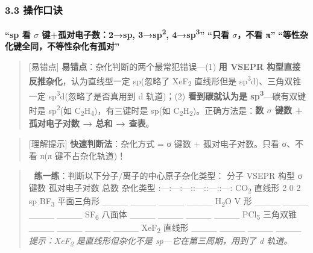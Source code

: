 \subsubsection{3.3 操作口诀}\label{ux64cdux4f5cux53e3ux8bc0}

\textbf{``sp 看 \(\sigma\) 键+孤对电子数：2→sp, 3→sp\textsuperscript{2}, 4→sp\textsuperscript{3}''}
\textbf{``只看 \(\sigma\)，不看 π''}
\textbf{``等性杂化键全同，不等性杂化有孤对''}

\begin{quote}
{[}易错点{]} \textbf{易错点}：杂化判断的两个最常犯错误---(1) \textbf{用 VSEPR 构型直接反推杂化}，认为直线型一定 sp(忽略了 XeF\textsubscript{2} 直线形但是 sp\textsuperscript{3}d)、三角双锥一定 sp\textsuperscript{3}d(忽略了是否真用到 d 轨道)；(2) \textbf{看到碳就认为是 sp\textsuperscript{3}}---碳有双键时是 sp\textsuperscript{2}(如 C\textsubscript{2}H\textsubscript{4})，有三键时是 sp(如 C\textsubscript{2}H\textsubscript{2})。正确方法是：\textbf{数 \(\sigma\) 键数 + 孤对电子对数 → 总和 → 查表}。
\end{quote}

\begin{quote}
{[}理解提示{]} \textbf{快速判断法}：杂化方式 = σ 键数 + 孤对电子对数。只看 σ、不看 π(π 键不占杂化轨道)！
\end{quote}

\begin{quote}
📝 \textbf{练一练}：判断以下分子/离子的中心原子杂化类型：
\textbar{} 分子 \textbar{} VSEPR 构型 \textbar{} σ 键数 \textbar{} 孤对电子对数 \textbar{} 总数 \textbar{} 杂化类型 \textbar{}
\textbar:---\textbar:---\textbar:---:\textbar:---:\textbar:---:\textbar:---:\textbar{}
\textbar{} CO\textsubscript{2} \textbar{} 直线形 \textbar{} 2 \textbar{} 0 \textbar{} 2 \textbar{} sp \textbar{}
\textbar{} BF\textsubscript{3} \textbar{} 平面三角形 \textbar{} \_\_\_\_ \textbar{} \_\_\_\_ \textbar{} \_\_\_\_ \textbar{} \_\_\_\_ \textbar{}
\textbar{} H\textsubscript{2}O \textbar{} V 形 \textbar{} \_\_\_\_ \textbar{} \_\_\_\_ \textbar{} \_\_\_\_ \textbar{} \_\_\_\_ \textbar{}
\textbar{} SF\textsubscript{6} \textbar{} 八面体 \textbar{} \_\_\_\_ \textbar{} \_\_\_\_ \textbar{} \_\_\_\_ \textbar{} \_\_\_\_ \textbar{}
\textbar{} PCl\textsubscript{5} \textbar{} 三角双锥 \textbar{} \_\_\_\_ \textbar{} \_\_\_\_ \textbar{} \_\_\_\_ \textbar{} \_\_\_\_ \textbar{}
\textbar{} XeF\textsubscript{2} \textbar{} 直线形 \textbar{} \_\_\_\_ \textbar{} \_\_\_\_ \textbar{} \_\_\_\_ \textbar{} \_\_\_\_ \textbar{}
\emph{提示：XeF\textsubscript{2} 是直线形但杂化不是 sp---它在第三周期，用到了 d 轨道。}
\end{quote}

